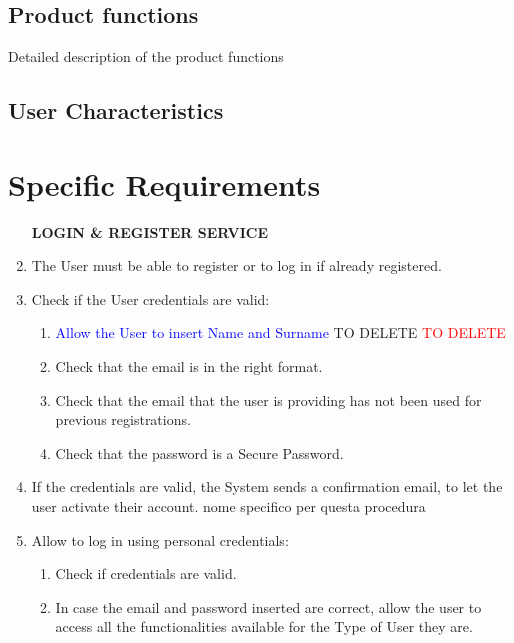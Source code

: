 \documentclass[a4paper, 10pt, oneside]{article}
\newcommand*{\lorenzo}[1]{\textcolor{BurntOrange}{#1}}
\newcommand{\yasmin}[1]{\textcolor{Red}{#1}}
\newcommand{\giovanni}[1]{\textcolor{Blue}{#1}}
\begin{document}
\subsection{Product functions}
Detailed description of the product functions

\subsection{User Characteristics}

\section{Specific Requirements}
\label{specificRequirements}

\begin{enumerate}[align=left]
    \item[\textbf{LOGIN \& REGISTER SERVICE}]
    \item The User must be able to register or to log in if already registered.
    \item \label{req:credentialsCheck} Check if the User credentials are valid:
    \begin{enumerate}[label={-}]
        \item \giovanni{Allow the User to insert Name and Surname} \lorenzo{TO DELETE} \yasmin{TO DELETE} %
        \item \label{req:credentialsCheck:email} Check that the email is in the right format.
        \item \label{req:credentialsCheck:uniqueness} Check that the email that the user is providing has not been used for previous registrations.
        \item \label{req:credentialsCheck:password}Check that the password is a Secure Password.
    \end{enumerate}
    \item \label{req:confirmRegistration}If the credentials are valid, the System sends a confirmation email, to let the user activate their account. \lorenzo{nome specifico per questa procedura}
    \item \label{req:login} Allow to log in using personal credentials:
    \begin{enumerate}[label={-}]
        \item \label{req:login:checkCred}Check if credentials are valid.
        \item \label{req:login:validCred} In case the email and password inserted are correct, allow the user to access all the functionalities available for the Type of User they are.

\end{enumerate}
\end{enumerate}
\end{document}
